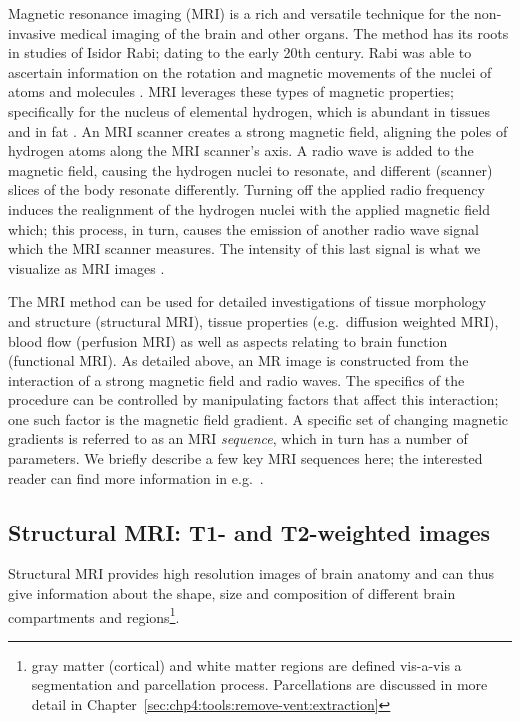 Magnetic resonance imaging (MRI) is a rich and versatile technique for
the non-invasive medical imaging of the brain and other organs.  The method has 
its roots in studies of Isidor Rabi; dating to the early 20th century.  Rabi 
was able to ascertain information on the rotation and magnetic movements of 
the nuclei of atoms and molecules \cite{thomas2013}.  MRI leverages these types 
of magnetic properties; specifically for the nucleus of elemental hydrogen, 
which is abundant in tissues and in fat \cite{berger2002}.  An MRI scanner 
creates a strong magnetic field, aligning the poles of hydrogen atoms along the 
MRI scanner's axis.  A radio wave is added to the magnetic field, causing the 
hydrogen nuclei to resonate, and different (scanner) slices of the body resonate 
differently.  Turning off the applied radio frequency induces the realignment 
of the hydrogen nuclei with the applied magnetic field which; this process, in 
turn, causes the emission of another radio wave signal which the MRI scanner 
measures.  The intensity of this last signal is what we visualize as MRI 
images \cite{berger2002}.    


The MRI method can be used for detailed investigations of tissue morphology and
structure (structural MRI), tissue properties (e.g.~diffusion weighted MRI),
blood flow (perfusion MRI) as well as aspects relating to brain
function (functional MRI). As detailed above, an MR image is constructed from 
the interaction of a strong magnetic field and radio waves.  The specifics of 
the procedure can be controlled by manipulating factors that affect this 
interaction; one such factor is the magnetic field gradient.  A specific set of 
changing magnetic gradients is referred to as an MRI \emph{sequence}, which in 
turn has a number of parameters. We briefly describe a few key MRI sequences 
here; the interested reader can find more information in
e.g.~\cite{haacke1999magnetic, payne2017cerebral, alexander2007diffusion}.

\subsection{Structural MRI: T1- and T2-weighted images}
\label{sec:T1T2}

Structural MRI provides high resolution images of brain anatomy and
can thus give information about the shape, size and composition of
different brain compartments and regions\footnote{gray matter (cortical) and 
white matter regions are defined vis-a-vis a segmentation and 
parcellation process.  Parcellations are discussed in more detail in 
Chapter~\ref{sec:chp4:tools:remove-vent:extraction}}. 

